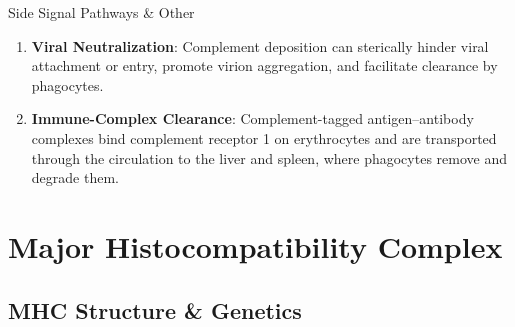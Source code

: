 \begin{core}[label=core:side_pathways]{Side Signal Pathways \& Other}
\begin{enumerate}
        \item \textbf{Viral Neutralization}: Complement deposition can sterically hinder viral attachment or entry, promote virion aggregation, and facilitate clearance by phagocytes.

        \item \textbf{Immune-Complex Clearance}: Complement-tagged antigen--antibody complexes bind complement receptor 1 on erythrocytes and are transported through the circulation to the liver and spleen, where phagocytes remove and degrade them.

      \end{enumerate}

    \end{core}

\section{Major Histocompatibility Complex}

  \subsection{MHC Structure \& Genetics}

